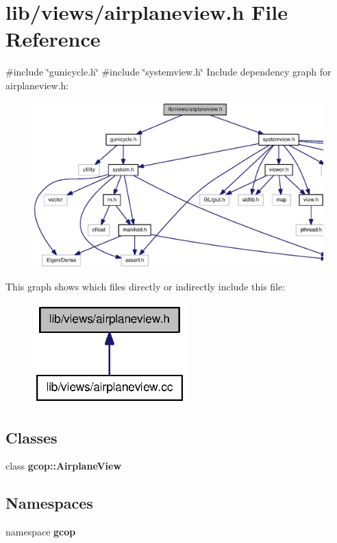 \section{lib/views/airplaneview.h \-File \-Reference}
\label{airplaneview_8h}
{\ttfamily \#include \char`\"{}gunicycle.\-h\char`\"{}}\*
{\ttfamily \#include \char`\"{}systemview.\-h\char`\"{}}\*
\-Include dependency graph for airplaneview.\-h\-:\nopagebreak
\begin{figure}[H]
\begin{center}
\leavevmode
\includegraphics[width=350pt]{airplaneview_8h__incl}
\end{center}
\end{figure}
\-This graph shows which files directly or indirectly include this file\-:\nopagebreak
\begin{figure}[H]
\begin{center}
\leavevmode
\includegraphics[width=168pt]{airplaneview_8h__dep__incl}
\end{center}
\end{figure}
\subsection*{\-Classes}
\begin{DoxyCompactItemize}
\item 
class {\bf gcop\-::\-Airplane\-View}
\end{DoxyCompactItemize}
\subsection*{\-Namespaces}
\begin{DoxyCompactItemize}
\item 
namespace {\bf gcop}
\end{DoxyCompactItemize}
